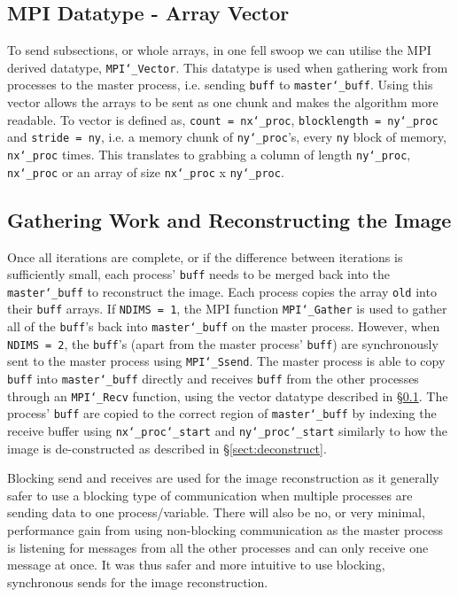 \documentclass[11pt, a4paper]{article}
\begin{document}
		\subsection{MPI Datatype - Array Vector} \label{sect:array_vector}
			To send subsections, or whole arrays, in one fell swoop we can utilise the MPI derived datatype, \texttt{MPI\char`_Vector}. This datatype is used when gathering work from processes to the master process, i.e. sending \texttt{buff} to \texttt{master\char`_buff}. Using this vector allows the arrays to be sent as one chunk and makes the algorithm more readable. To vector is defined as, \texttt{count = nx\char`_proc}, \texttt{blocklength = ny\char`_proc} and \texttt{stride = ny}, i.e. a memory chunk of \texttt{ny\char`_proc}'s, every \texttt{ny} block of memory, \texttt{nx\char`_proc} times. This translates to grabbing a column of length \texttt{ny\char`_proc}, \texttt{nx\char`_proc} or an array of size \texttt{nx\char`_proc} x \texttt{ny\char`_proc}.	
		
		\subsection{Gathering Work and Reconstructing the Image} \label{sect:reconstruct}
			Once all iterations are complete, or if the difference between iterations is sufficiently small, each process' \texttt{buff} needs to be merged back into the \texttt{master\char`_buff} to reconstruct the image. Each process copies the array \texttt{old} into their \texttt{buff} arrays. If \texttt{NDIMS = 1}, the MPI function \texttt{MPI\char`_Gather} is used to gather all of the \texttt{buff}'s back into \texttt{master\char`_buff} on the master process. However, when \texttt{NDIMS = 2}, the \texttt{buff}'s (apart from the master process' \texttt{buff}) are synchronously sent to the master process using \texttt{MPI\char`_Ssend}. The master process is able to copy \texttt{buff} into \texttt{master\char`_buff} directly and receives \texttt{buff} from the other processes through an \texttt{MPI\char`_Recv} function, using the vector datatype described in \S\ref{sect:array_vector}. The process' \texttt{buff} are copied to the correct region of \texttt{master\char`_buff} by indexing the receive buffer using \texttt{nx\char`_proc\char`_start} and \texttt{ny\char`_proc\char`_start} similarly to how the image is de-constructed as described in \S\ref{sect:deconstruct}.
			
			Blocking send and receives are used for the image reconstruction as it generally safer to use a blocking type of communication when multiple processes are sending data to one process/variable. There will also be no, or very minimal, performance gain from using non-blocking communication as the master process is listening for messages from all the other processes and can only receive one message at once. It was thus safer and more intuitive to use blocking, synchronous sends for the image reconstruction.
\end{document}
